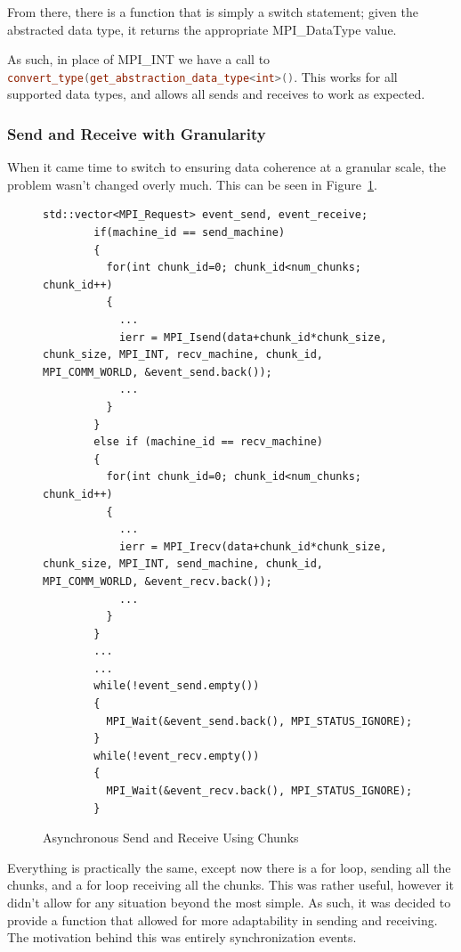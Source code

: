 \documentclass[../thesis.tex]{subfiles}
\begin{document}
    From there, there is a function that is simply a switch statement; given the abstracted data type, it returns the appropriate MPI\_DataType value.

    As such, in place of MPI\_INT we have a call to 
    \lstinline[language=cpp]{convert_type(get_abstraction_data_type<int>()}. This works for all supported data types, and allows all sends and receives to work as expected.

  \subsubsection{Send and Receive with Granularity} %
  \label{ssub:send_and_receive_with_granularity}
  
    When it came time to switch to ensuring data coherence at a granular scale, the problem wasn't changed overly much. This can be seen in Figure~\ref{fig:async_send_recv_using_chunks}.

    \begin{figure}[htbp]
      \centering

      \lstset{language=cpp}  
      \begin{lstlisting}[tabsize=2]
        std::vector<MPI_Request> event_send, event_receive;
        if(machine_id == send_machine)
        {
          for(int chunk_id=0; chunk_id<num_chunks; chunk_id++)
          {
            ...
            ierr = MPI_Isend(data+chunk_id*chunk_size, chunk_size, MPI_INT, recv_machine, chunk_id, MPI_COMM_WORLD, &event_send.back());
            ...
          }
        }
        else if (machine_id == recv_machine)
        {
          for(int chunk_id=0; chunk_id<num_chunks; chunk_id++)
          {
            ...
            ierr = MPI_Irecv(data+chunk_id*chunk_size, chunk_size, MPI_INT, send_machine, chunk_id, MPI_COMM_WORLD, &event_recv.back());
            ...
          }
        }
        ...
        ...
        while(!event_send.empty())
        {
          MPI_Wait(&event_send.back(), MPI_STATUS_IGNORE);
        }
        while(!event_recv.empty())
        {
          MPI_Wait(&event_recv.back(), MPI_STATUS_IGNORE);
        }

        \end{lstlisting}

      \caption{Asynchronous Send and Receive Using Chunks}
      \label{fig:async_send_recv_using_chunks}
    \end{figure}

    Everything is practically the same, except now there is a for loop, sending all the chunks, and a for loop receiving all the chunks. This was rather useful, however it didn't allow for any situation beyond the most simple. As such, it was decided to provide a function that allowed for more adaptability in sending and receiving. The motivation behind this was entirely synchronization events.
\end{document}
